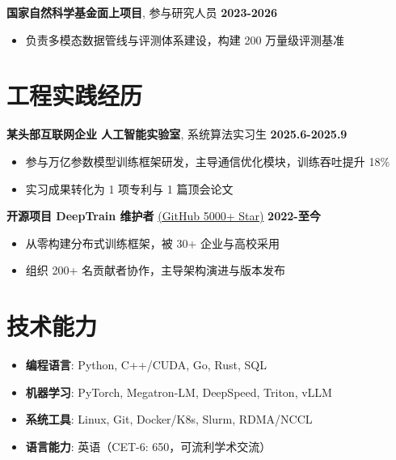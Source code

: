 \vspace{0.5em}
{\large{\textbf{国家自然科学基金面上项目}, 参与研究人员}} \hfill \textbf{2023-2026}
\begin{itemize}
    \item 负责多模态数据管线与评测体系建设，构建 200 万量级评测基准
\end{itemize}

\section{\makebox[\widthof{\faBriefcase}][c]{\color{USTB_Blue}{\faBriefcase}}\quad 工程实践经历}
\vspace{0.3em}
{\large{\textbf{某头部互联网企业 人工智能实验室}, 系统算法实习生}} \hfill \textbf{2025.6-2025.9}
\begin{itemize}
  \item 参与万亿参数模型训练框架研发，主导通信优化模块，训练吞吐提升 18\%
  \item 实习成果转化为 1 项专利与 1 篇顶会论文
\end{itemize}

\vspace{0.5em}
{\large{\textbf{开源项目 DeepTrain 维护者}} \href{https://github.com/example}{(GitHub 5000+ Star)}} \hfill \textbf{2022-至今}
\begin{itemize}
    \item 从零构建分布式训练框架，被 30+ 企业与高校采用
    \item 组织 200+ 名贡献者协作，主导架构演进与版本发布
\end{itemize}

\section{\makebox[\widthof{\faWrench}][c]{\color{USTB_Blue}{\faWrench}}\quad 技术能力}
\vspace{0.3em}
\begin{itemize}
  \item \textbf{编程语言}: Python, C++/CUDA, Go, Rust, SQL
  \item \textbf{机器学习}: PyTorch, Megatron-LM, DeepSpeed, Triton, vLLM
  \item \textbf{系统工具}: Linux, Git, Docker/K8s, Slurm, RDMA/NCCL
  \item \textbf{语言能力}: 英语（CET-6: 650，可流利学术交流）
\end{itemize}

